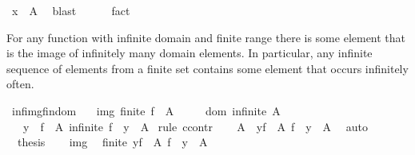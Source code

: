 \begin{isabellebody}
\ {\isacartoucheopen}x\ {\isasymin}\ A{\isacartoucheclose}\ \isamarkupfalse%
\ blast\isanewline
\ \ \ \ \isamarkupfalse%
\ fact\isanewline
\ \ \isamarkupfalse%
\isanewline
{}\isamarkupfalse%
%
\endisatagproof
{\isafoldproof}%
%
\isadelimproof
%
\endisadelimproof
%
\begin{isamarkuptext}%
For any function with infinite domain and finite range there is some
  element that is the image of infinitely many domain elements.  In
  particular, any infinite sequence of elements from a finite set
  contains some element that occurs infinitely often.%
\end{isamarkuptext}\isamarkuptrue%
\isamarkupfalse%
\ inf{\isacharunderscore}{\kern0pt}img{\isacharunderscore}{\kern0pt}fin{\isacharunderscore}{\kern0pt}dom{\isacharprime}{\kern0pt}{\isacharcolon}{\kern0pt}\isanewline
\ \ \ img{\isacharcolon}{\kern0pt}\ {\isachardoublequoteopen}finite\ {\isacharparenleft}{\kern0pt}f\ {\isacharbackquote}{\kern0pt}\ A{\isacharparenright}{\kern0pt}{\isachardoublequoteclose}\isanewline
\ \ \ \ \ dom{\isacharcolon}{\kern0pt}\ {\isachardoublequoteopen}infinite\ A{\isachardoublequoteclose}\isanewline
\ \ \ {\isachardoublequoteopen}{\isasymexists}y\ {\isasymin}\ f\ {\isacharbackquote}{\kern0pt}\ A{\isachardot}{\kern0pt}\ infinite\ {\isacharparenleft}{\kern0pt}f\ {\isacharminus}{\kern0pt}{\isacharbackquote}{\kern0pt}\ {\isacharbraceleft}{\kern0pt}y{\isacharbraceright}{\kern0pt}\ {\isasyminter}\ A{\isacharparenright}{\kern0pt}{\isachardoublequoteclose}\isanewline
%
\isadelimproof
%
\endisadelimproof
%
\isatagproof
{}\isamarkupfalse%
\ {\isacharparenleft}{\kern0pt}rule\ ccontr{\isacharparenright}{\kern0pt}\isanewline
\ \ \isamarkupfalse%
\ {\isachardoublequoteopen}A\ {\isasymsubseteq}\ {\isacharparenleft}{\kern0pt}{\isasymUnion}y{\isasymin}f\ {\isacharbackquote}{\kern0pt}\ A{\isachardot}{\kern0pt}\ f\ {\isacharminus}{\kern0pt}{\isacharbackquote}{\kern0pt}\ {\isacharbraceleft}{\kern0pt}y{\isacharbraceright}{\kern0pt}\ {\isasyminter}\ A{\isacharparenright}{\kern0pt}{\isachardoublequoteclose}\ \isamarkupfalse%
\ auto\isanewline
\ \ \isamarkupfalse%
\ \isamarkupfalse%
\ {\isachardoublequoteopen}{\isasymnot}\ {\isacharquery}{\kern0pt}thesis{\isachardoublequoteclose}\isanewline
\ \ \isamarkupfalse%
\ img\ \isamarkupfalse%
\ {\isachardoublequoteopen}finite\ {\isacharparenleft}{\kern0pt}{\isasymUnion}y{\isasymin}f\ {\isacharbackquote}{\kern0pt}\ A{\isachardot}{\kern0pt}\ f\ {\isacharminus}{\kern0pt}{\isacharbackquote}{\kern0pt}\ {\isacharbraceleft}{\kern0pt}y{\isacharbraceright}{\kern0pt}\ {\isasyminter}\ A{\isacharparenright}{\kern0pt}{\isachardoublequoteclose}\ \isamarkupfalse%

\end{isabellebody}
